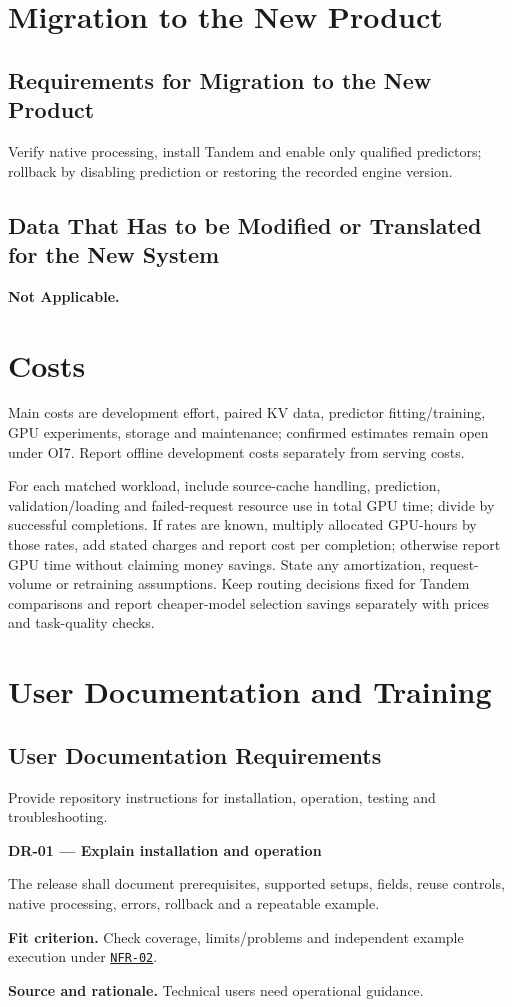 \documentclass[12pt]{article}
\begin{document}
\section{Migration to the New Product}


\subsection{Requirements for Migration to the New Product}
Verify native processing, install Tandem and enable only qualified predictors;
rollback by disabling prediction or restoring the recorded engine version.


\subsection{Data That Has to be Modified or Translated for the New System}
\textbf{Not Applicable.}


\section{Costs}
Main costs are development effort, paired KV data, predictor fitting/training,
GPU experiments, storage and maintenance; confirmed estimates remain open
under OI7. Report offline development costs separately from serving costs.

For each matched workload, include source-cache handling, prediction,
validation/loading and failed-request resource use in total GPU time; divide
by successful completions. If rates are known, multiply allocated GPU-hours
by those rates, add stated charges and report cost per completion; otherwise
report GPU time without claiming money savings. State any amortization,
request-volume or retraining assumptions. Keep routing decisions fixed for
Tandem comparisons and report cheaper-model selection savings separately
with prices and task-quality checks.


\section{User Documentation and Training}


\subsection{User Documentation Requirements}
Provide repository instructions for installation, operation, testing and troubleshooting.

\par\medskip\noindent{}\label{req:DR-01}
\textbf{DR-01 --- Explain installation and operation}\par
The release shall document prerequisites, supported setups, fields, reuse controls, native processing, errors, rollback and a repeatable example.\par
\textbf{Fit criterion.} Check coverage, limits/problems and independent example execution under \hyperref[req:NFR-02]{\texttt{NFR-02}}.\par
\textbf{Source and rationale.} Technical users need operational guidance.
\end{document}
